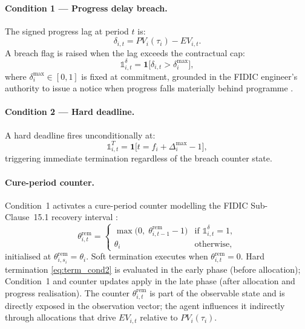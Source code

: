\paragraph{Condition 1 --- Progress delay breach.}
The signed progress lag at period $t$ is:
\begin{equation}
  \delta_{i,t} = PV_i(\tau_i) - EV_{i,t}.
  \label{eq:progress_lag}
\end{equation}
A breach flag is raised when the lag exceeds the contractual cap:
\begin{equation}
  \mathbb{1}^{\delta}_{i,t}
    = \mathbf{1}\!\bigl[\delta_{i,t} > \delta^{\max}_i\bigr],
  \label{eq:term_cond1}
\end{equation}
where $\delta^{\max}_i \in [0,1]$ is fixed at commitment, grounded in
the FIDIC engineer's authority to issue a notice when progress falls
materially behind programme \citep{FIDIC2017}.

\paragraph{Condition 2 --- Hard deadline.}
A hard deadline fires unconditionally at:
\begin{equation}
  \mathbb{1}^{T}_{i,t}
  = \mathbf{1}\!\bigl[t = f_i + \Delta^{\max}_i - 1\bigr],
  \label{eq:term_cond2}
\end{equation}
triggering immediate termination regardless of the breach counter
state.

\paragraph{Cure-period counter.}
Condition~1 activates a cure-period counter modelling the FIDIC
Sub-Clause~15.1 recovery interval \citep{FIDIC2017, Ndekugri2008}:
\begin{equation}
  \theta^{\mathrm{rem}}_{i,t}
    = \begin{cases}
        \max\!\bigl(0,\; \theta^{\mathrm{rem}}_{i,t-1} - 1\bigr)
          & \text{if } \mathbb{1}^{\delta}_{i,t} = 1, \\
        \theta_i
          & \text{otherwise,}
      \end{cases}
  \label{eq:counter}
\end{equation}
initialised at $\theta^{\mathrm{rem}}_{i,s_i} = \theta_i$. Soft
termination executes when $\theta^{\mathrm{rem}}_{i,t} = 0$. Hard
termination \eqref{eq:term_cond2} is evaluated in the early phase
(before allocation); Condition~1 and counter updates apply in the late
phase (after allocation and progress realisation). The counter
$\theta^{\mathrm{rem}}_{i,t}$ is part of the observable state and is
directly exposed in the observation vector; the agent influences it
indirectly through allocations that drive $EV_{i,t}$ relative to
$PV_i(\tau_i)$.

